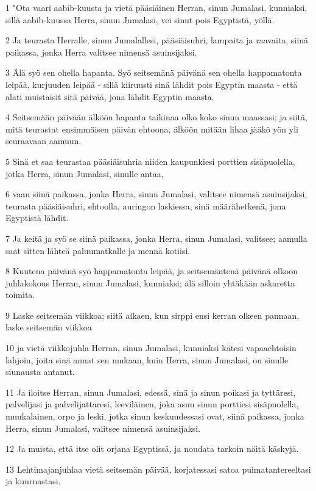 \par 1 "Ota vaari aabib-kuusta ja vietä pääsiäinen Herran, sinun Jumalasi, kunniaksi, sillä aabib-kuussa Herra, sinun Jumalasi, vei sinut pois Egyptistä, yöllä.
\par 2 Ja teurasta Herralle, sinun Jumalallesi, pääsiäisuhri, lampaita ja raavaita, siinä paikassa, jonka Herra valitsee nimensä asuinsijaksi.
\par 3 Älä syö sen ohella hapanta. Syö seitsemänä päivänä sen ohella happamatonta leipää, kurjuuden leipää - sillä kiiruusti sinä lähdit pois Egyptin maasta - että alati muistaisit sitä päivää, jona lähdit Egyptin maasta.
\par 4 Seitsemään päivään älköön hapanta taikinaa olko koko sinun maassasi; ja siitä, mitä teurastat ensimmäisen päivän ehtoona, älköön mitään lihaa jääkö yön yli seuraavaan aamuun.
\par 5 Sinä et saa teurastaa pääsiäisuhria niiden kaupunkiesi porttien sisäpuolella, jotka Herra, sinun Jumalasi, sinulle antaa,
\par 6 vaan siinä paikassa, jonka Herra, sinun Jumalasi, valitsee nimensä asuinsijaksi, teurasta pääsiäisuhri, ehtoolla, auringon laskiessa, sinä määrähetkenä, jona Egyptistä lähdit.
\par 7 Ja keitä ja syö se siinä paikassa, jonka Herra, sinun Jumalasi, valitsee; aamulla saat sitten lähteä paluumatkalle ja mennä kotiisi.
\par 8 Kuutena päivänä syö happamatonta leipää, ja seitsemäntenä päivänä olkoon juhlakokous Herran, sinun Jumalasi, kunniaksi; älä silloin yhtäkään askaretta toimita.
\par 9 Laske seitsemän viikkoa; siitä alkaen, kun sirppi ensi kerran olkeen pannaan, laske seitsemän viikkoa
\par 10 ja vietä viikkojuhla Herran, sinun Jumalasi, kunniaksi kätesi vapaaehtoisin lahjoin, joita sinä annat sen mukaan, kuin Herra, sinun Jumalasi, on sinulle siunausta antanut.
\par 11 Ja iloitse Herran, sinun Jumalasi, edessä, sinä ja sinun poikasi ja tyttäresi, palvelijasi ja palvelijattaresi, leeviläinen, joka asuu sinun porttiesi sisäpuolella, muukalainen, orpo ja leski, jotka sinun keskuudessasi ovat, siinä paikassa, jonka Herra, sinun Jumalasi, valitsee nimensä asuinsijaksi.
\par 12 Ja muista, että itse olit orjana Egyptissä, ja noudata tarkoin näitä käskyjä.
\par 13 Lehtimajanjuhlaa vietä seitsemän päivää, korjatessasi satoa puimatantereeltasi ja kuurnastasi.
